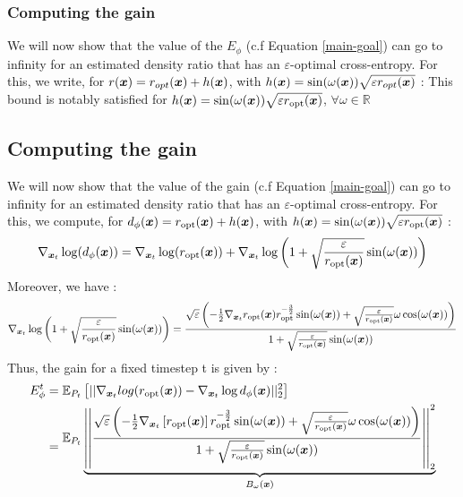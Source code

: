 \subsubsection{Computing the gain}
We will now show that the value of the $E_\phi$ (c.f Equation \ref{main-goal}) can go to infinity for an estimated density ratio that has an $\varepsilon$-optimal cross-entropy. For this, we write, for $r(\boldsymbol{x}) = r_{opt}(\boldsymbol{x}) + h(\boldsymbol{x})$, with $h(\boldsymbol{x}) =\sin(\omega (\boldsymbol{x}))\sqrt{\varepsilon r_{opt}(\boldsymbol{x})} $ :
This bound is notably satisfied for $h(\boldsymbol{x}) = \sin(\omega (\boldsymbol{x}))\sqrt{\varepsilon r_{{\mathrm{opt}}}(\boldsymbol{x})} $, $\forall \omega \in \mathbb{R}$
\subsection{Computing the gain}
We will now show that the value of the gain (c.f Equation \ref{main-goal}) can go to infinity for an estimated density ratio that has an $\varepsilon$-optimal cross-entropy. For this, we compute, for $d_{\phi}(\boldsymbol{x}) = r_{{\mathrm{opt}}}(\boldsymbol{x}) + h(\boldsymbol{x})$, with $h(\boldsymbol{x}) =\sin(\omega (\boldsymbol{x}))\sqrt{\varepsilon r_{{\mathrm{opt}}}(\boldsymbol{x})} $ :
\begin{align}
    \nabla_{\boldsymbol{x}_t} \log(d_{\phi}(\boldsymbol{x})) = \nabla_{\boldsymbol{x}_t} \log(r_{{\mathrm{opt}}}(\boldsymbol{x})) + \nabla_{\boldsymbol{x}_t} \log\left( 1 + \sqrt{\frac{\varepsilon}{r_{{\mathrm{opt}}}(\boldsymbol{x})}} \sin(\omega (\boldsymbol{x})) \right)
\end{align}
Moreover, we have : 
\begin{align}
    \nabla_{\boldsymbol{x}_t} \log\left( 1 + \sqrt{\frac{\varepsilon}{r_{{\mathrm{opt}}}(\boldsymbol{x})}} \sin(\omega (\boldsymbol{x})) \right) = \frac{\sqrt{\varepsilon}\left(
    -\frac{1}{2}\nabla_{\boldsymbol{x}_t} r_{{\mathrm{opt}}}(\boldsymbol{x})r_{{\mathrm{opt}}}^{-\frac{3}{2}}\sin(\omega (\boldsymbol{x})) + \sqrt{\frac{\varepsilon}{r_{{\mathrm{opt}}}(\boldsymbol{x})}} \omega \cos(\omega (\boldsymbol{x}))
    \right)}{1 + \sqrt{\frac{\varepsilon}{r_{{\mathrm{opt}}}(\boldsymbol{x})}} \sin(\omega (\boldsymbol{x}))}
\end{align}
Thus, the gain for a fixed timestep t is given by : 
\begin{align}
    E_{\phi}^{t} &=\begin{aligned} 
    \mathbb{E}_{P_{t}}\left[ 
    ||\nabla_{\boldsymbol{x}_t} log (r_{{\mathrm{opt}}}(\boldsymbol{x})) - \nabla_{\boldsymbol{x}_t} \log d_{\phi}(\boldsymbol{x}) ||_{2}^{2}
    \right] 
    \end{aligned}
    \\
    &=\begin{aligned} \mathbb{E}_{P_{t}}\underbrace{\left|\left|\frac{\sqrt{\varepsilon}\left(
    -\frac{1}{2}\nabla_{\boldsymbol{x}_t} \left[r_{{\mathrm{opt}}}(\boldsymbol{x})\right]r_{{\mathrm{opt}}}^{-\frac{3}{2}}\sin(\omega (\boldsymbol{x})) + \sqrt{\frac{\varepsilon}{r_{{\mathrm{opt}}}(\boldsymbol{x})}} \omega \cos(\omega (\boldsymbol{x}))
    \right)}{1 + \sqrt{\frac{\varepsilon}{r_{{\mathrm{opt}}}(\boldsymbol{x})}} \sin(\omega (\boldsymbol{x}))} \right|\right|_{2}^{2}}_{B_{\omega}(\boldsymbol{x})}
    \end{aligned}
\end{align}
